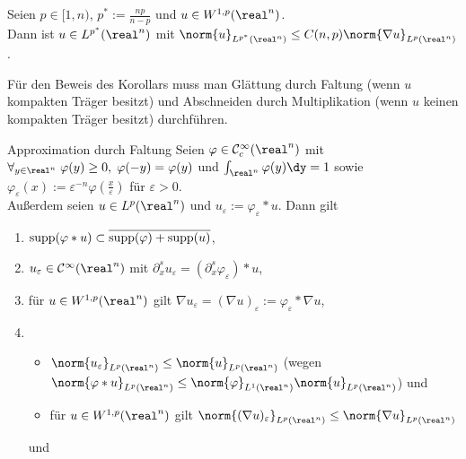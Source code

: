 \begin{Kor}
    Seien $p \in [1, n)$, $p^\ast := \frac{np}{n - p}$ und $u \in W^{1,p}(\real^n)$.\\
    Dann ist $u \in L^{p^\ast}(\real^n)$ mit
    $\norm{u}_{L^{p^\ast}(\real^n)} \le C(n,p) \norm{\nabla u}_{L^p(\real^n)}$.
\end{Kor}

\linie

\begin{Bem}
    Für den Beweis des Korollars muss man Glättung durch Faltung
    (wenn $u$ kompakten Träger besitzt) und Abschneiden durch Multiplikation
    (wenn $u$ keinen kompakten Träger besitzt) durchführen.
\end{Bem}

\begin{Lemma}{Approximation durch Faltung}
    Seien $\varphi \in \C^\infty_c(\real^n)$ mit\\
    $\forall_{y \in \real^n}\; \varphi(y) \ge 0,\; \varphi(-y) = \varphi(y)$ und
    $\int_{\real^n} \varphi(y)\dy = 1$ sowie
    $\varphi_\varepsilon(x) := \varepsilon^{-n} \varphi(\frac{x}{\varepsilon})$
    für $\varepsilon > 0$.\\
    Außerdem seien $u \in L^p(\real^n)$ und $u_\varepsilon := \varphi_\varepsilon \ast u$.
    Dann gilt
    \begin{enumerate}
        \item
        $\operatorname{supp}(\varphi \ast u) \subset \overline{\operatorname{supp}(\varphi) + \operatorname{supp}(u)}$,

        \item
        $u_\varepsilon \in \C^\infty(\real^n)$ mit
        $\partial_x^s u_\varepsilon = (\partial_x^s \varphi_\varepsilon) \ast u$,

        \item
        für $u \in W^{1,p}(\real^n)$ gilt
        $\nabla u_\varepsilon = (\nabla u)_\varepsilon := \varphi_\varepsilon \ast \nabla u$,

        \item
        \begin{itemize}
            \item
            $\norm{u_\varepsilon}_{L^p(\real^n)} \le \norm{u}_{L^p(\real^n)}$
            (wegen $\norm{\varphi \ast u}_{L^p(\real^n)} \le
            \norm{\varphi}_{L^1(\real^n)} \norm{u}_{L^p(\real^n)}$) und

            \item
            für $u \in W^{1,p}(\real^n)$ gilt
            $\norm{(\nabla u)_\varepsilon}_{L^p(\real^n)} \le \norm{\nabla u}_{L^p(\real^n)}$
        \end{itemize}
        und


\end{enumerate}
\end{Lemma}
